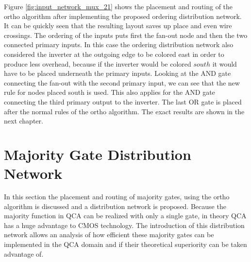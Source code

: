 Figure \ref{fig:input_network_mux_21} shows the placement and routing of the ortho algorithm after implementing the proposed ordering distribution network. It can be quickly seen that the resulting layout saves up place and even wire crossings. The ordering of the inputs puts first the fan-out node and then the two connected primary inputs. In this case the ordering distribution network also considered the inverter at the outgoing edge to be colored east in order to produce less overhead, because if the inverter would be colored $south$ it would have to be placed underneath the primary inputs. Looking at the AND gate connecting the fan-out with the second primary input, we can see that the new rule for nodes placed south is used. This also applies for the AND gate connecting the third primary output to the inverter. The last OR gate is placed after the normal rules of the ortho algorithm. The exact results are shown in the next chapter.

\section{Majority Gate Distribution Network}
In this section the placement and routing of majority gates, using the ortho algorithm is discussed and a distribution network is proposed. Because the majority function in QCA can be realized with only a single gate, in theory QCA has a huge advantage to CMOS technology. The introduction of this distribution network allows an analysis of how efficient these majority gates can be implemented in the QCA domain and if their theoretical superiority can be taken advantage of.
